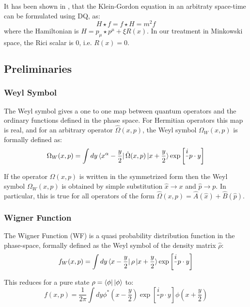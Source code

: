\documentclass[twoside,a4paper,11pt]{article}
\numberwithin{equation}{section}
\begin{document}
It has been shown in \cite{TillmanSparling:KGinDQ}, that the Klein-Gordon equation in an arbitraty space-time can be formulated using DQ, as:
\begin{equation}
    H \star f = f \star H = m^2 f
\end{equation}
where the Hamiltonian is $H = p_\mu \star p^\mu + \xi R(x)$. In our treatment in Minkowski space, the Rici scalar is 0, i.e. $R(x) = 0$.

\subsection{Preliminaries}
\subsubsection{Weyl Symbol}

The Weyl symbol gives a one to one map between quantum operators and the ordinary functions defined in the phase space. For Hermitian operators this map is real, and for an arbitrary operator $\hat{\Omega}(x,p)$, the Weyl symbol $\Omega_W(x,p)$ is formally defined as:
\begin{equation}
    \Omega_W(x,p) = \int dy \bra{x^\alpha - \frac{y}{2}}\hat{\Omega}(x,p) \ket{x + \frac{y}{2}}\exp\left[\frac{i}{ }p\cdot y\right]
\end{equation}

If the operator $\hat{\Omega}(x,p)$  is written in the symmetrized form then the Weyl symbol $\Omega_W(x,p)$ is obtained by simple substitution $\hat{x}\rightarrow x$ and $\hat{p}\rightarrow p$. In particular, this is true for all operators of the form $\hat{\Omega}(x,p) = \hat{A}(\hat{x}) + \hat{B}(\hat{p})$.

\subsubsection{Wigner Function}

The Wigner Function (WF) is a quasi probability distribution function in the phase-space, formally defined as the Weyl symbol of the density matrix $\hat{\rho}$:
\begin{equation}
    f_W(x,p) = \int dy\bra{x-\frac{y}{2}}\rho\ket{x+\frac{y}{2}}\exp\left[\frac{i}{ }p \cdot y\right]
\end{equation}

This reduces for a pure state $\rho = \bra{\phi}\ket{\phi}$ to:
\begin{equation}
    f(x,p) = \frac{1}{2\pi}\int dy \phi^*\left(x-\frac{y}{2}\right) \exp\left[\frac{i}{ }p \cdot y \right]\phi \left(x+\frac{y}{2}\right)
\end{equation}
\end{document}
